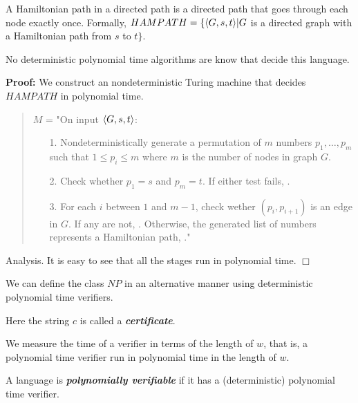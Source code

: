 \documentclass[a4paper,blends,pdf,colorBG,slideColor]{prosper}
\begin{document}
{\small
A Hamiltonian path in a directed path is a directed path that goes through each node exactly once.  Formally, $HAMPATH = \{ \langle {G,s,t} \rangle| G$ is a directed graph
with a Hamiltonian path from $s$ to $t \}$.

No deterministic polynomial time algorithms are know that decide this language.


{\bf Proof:} We construct an nondeterministic Turing machine that decides $HAMPATH$
in polynomial time.

\begin{quote}
$M$ = "On input $\langle {G,s,t} \rangle$:
\begin{itemize}
\item[1.] Nondeterministically generate a permutation of $m$ numbers $p_1,\ldots,p_m$ such that $1 \le p_i \le m$ where $m$ is the 
number of nodes in graph $G$.  
 \item[2.] Check whether $p_1 = s$ and $p_m = t$.
 If either test fails, \reject.
 \item[3.] For each $i$ between $1$ and $m-1$, check wether  $(p_i, p_{i+1})$
 is an edge in $G$. If any are not, \reject.  Otherwise, the generated list
 of numbers represents a Hamiltonian path, \accept."
\end{itemize}
\end{quote}
Analysis. It is easy to see that all the stages run in polynomial time.  $\Box$
}
\es

We can define the class $NP$ in an alternative manner using deterministic polynomial time verifiers.


Here the string $c$ is called a {\bf\em certificate}.

We measure the time of a verifier in terms of the length of $w$, that is, a 
polynomial time verifier run in polynomial time in the length of $w$.

A language is {\bf\em polynomially verifiable} if it has a (deterministic) polynomial time verifier.

\es
\end{document}
